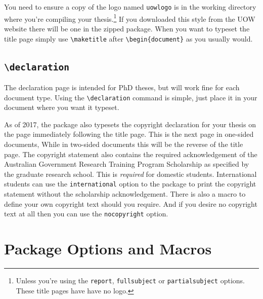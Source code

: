 \documentclass[12pt,oneside]{article}
\newcommand{\option}[1]{\texttt{\color{UOWblue}#1}}
\newcommand{\command}[1]{\texttt{\color{UOWred}#1}}
\newcommand{\comoptions}[1]{\texttt{\color{UOWdarkblue}#1}}
\begin{document}
You need to ensure a copy of the logo named \texttt{uow\textunderscore{}logo} is in the working directory where you're compiling your thesis.\footnote{Unless you're using the \option{report}, \option{fullsubject} or \option{partialsubject} options. These title pages have have no logo.} If you downloaded this style from the UOW website there will be one in the zipped package. When you want to typeset the title page simply use \command{\textbackslash{}maketitle} after \command{\textbackslash{}begin}\comoptions{\{document\}} as you usually would.

\subsection*{\command{\textbackslash{}declaration}}
The declaration page is intended for PhD theses, but will work fine for each document type. Using the \command{\textbackslash{}declaration} command is simple, just place it in your document where you want it typeset. 

As of 2017, the package also typesets the copyright declaration for your thesis on the page immediately following the title page. This is the next page in one-sided documents, While in two-sided documents this will be the reverse of the title page. The copyright statement also contains the required acknowledgement of the Australian Government Research Training Program Scholarship as specified by the graduate research school. This is \emph{required} for domestic students. International students can use the \option{international} option to the package to print the copyright statement without the scholarship acknowledgement. There is also a macro to define your own copyright text should you require. And if you desire no copyright text at all then you can use the \option{nocopyright} option. 


\section{Package Options and Macros}
\end{document}
